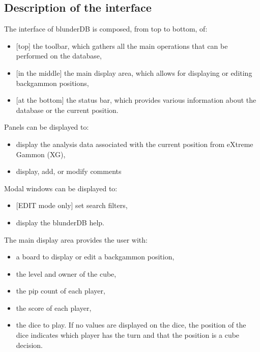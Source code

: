 \documentclass[letterpaper,10pt,english]{sphinxmanual}
\begin{document}
\subsection{Description of the interface}
\label{\detokenize{manuel:description-de-l-interface}}
\sphinxAtStartPar
The interface of blunderDB is composed, from top to bottom, of:
\begin{itemize}
\item {} 
\sphinxAtStartPar
{[}top{]} the toolbar, which gathers all the main operations that can be performed on the database,

\item {} 
\sphinxAtStartPar
{[}in the middle{]} the main display area, which allows for displaying or editing backgammon positions,

\item {} 
\sphinxAtStartPar
{[}at the bottom{]} the status bar, which provides various information about the database or the current position.

\end{itemize}

\sphinxAtStartPar
Panels can be displayed to:
\begin{itemize}
\item {} 
\sphinxAtStartPar
display the analysis data associated with the current position from eXtreme Gammon (XG),

\item {} 
\sphinxAtStartPar
display, add, or modify comments

\end{itemize}

\sphinxAtStartPar
Modal windows can be displayed to:
\begin{itemize}
\item {} 
\sphinxAtStartPar
{[}EDIT mode only{]} set search filters,

\item {} 
\sphinxAtStartPar
display the blunderDB help.

\end{itemize}

\sphinxAtStartPar
The main display area provides the user with:
\begin{itemize}
\item {} 
\sphinxAtStartPar
a board to display or edit a backgammon position,

\item {} 
\sphinxAtStartPar
the level and owner of the cube,

\item {} 
\sphinxAtStartPar
the pip count of each player,

\item {} 
\sphinxAtStartPar
the score of each player,

\item {} 
\sphinxAtStartPar
the dice to play. If no values are displayed on the dice, the position of the dice indicates which player has the turn and that the position is a cube decision.

\end{itemize}
\end{document}
